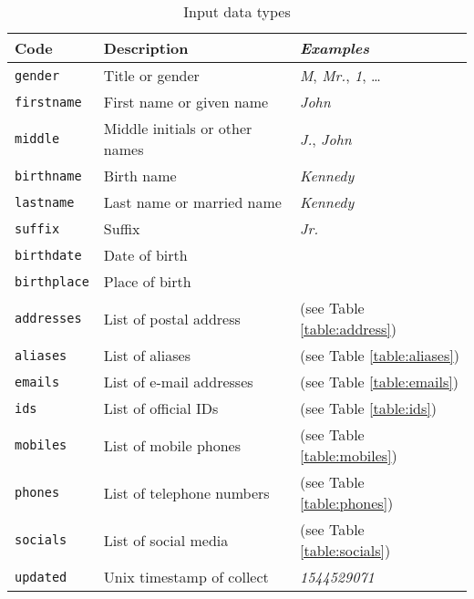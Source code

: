 \documentclass[twoside,twocolumn]{article}
\theoremstyle{definition}
\theoremstyle{remark}
\begin{document}
\begin{table}[htb]
    \centering
    \caption{Input data types}
    \begin{tabular*}{0.75\textwidth}{l|l||l}
        Code & Description & \textit{Examples} \\
        \hline \hline
        \texttt{gender} & Title or gender & \textit{M}, \textit{Mr.}, \textit{1}, \dots \\
        \hline
        \texttt{firstname} & First name or given name & \textit{John} \\
        \hline
        \texttt{middle} & Middle initials or other names & \textit{J.}, \textit{John} \\
        \hline
        \texttt{birthname} & Birth name & \textit{Kennedy} \\
        \hline
        \texttt{lastname} & Last name or married name & \textit{Kennedy} \\
        \hline
        \texttt{suffix} & Suffix & \textit{Jr.} \\
        \hline
        \texttt{birthdate} & Date of birth & \\
        \hline
        \texttt{birthplace} & Place of birth & \\
        \hline
        \texttt{addresses} & List of postal address & (see Table \ref{table:address}) \\
        \hline
        \texttt{aliases} & List of aliases & (see Table \ref{table:aliases}) \\
        \hline
        \texttt{emails} & List of e-mail addresses & (see Table \ref{table:emails}) \\
        \hline
        \texttt{ids} & List of official IDs & (see Table \ref{table:ids}) \\
        \hline
        \texttt{mobiles} & List of mobile phones & (see Table \ref{table:mobiles}) \\
        \hline
        \texttt{phones} & List of telephone numbers & (see Table \ref{table:phones}) \\
        \hline
        \texttt{socials} & List of social media & (see Table \ref{table:socials}) \\
        \hline
        \texttt{updated} & Unix timestamp of collect & \textit{1544529071}
        \label{table:inputTypes}
    \end{tabular*}
\end{table}
\end{document}
